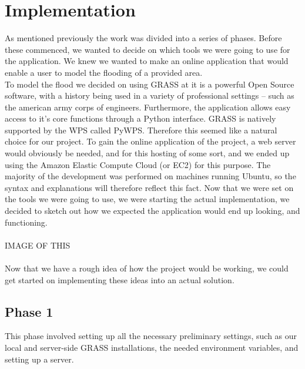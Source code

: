 
\chapter{Implementation} %

\label{ch:implementation} %


As mentioned previously the work was divided into a series of phases. Before these commenced, we wanted to decide on which tools we were going to use for the application. 
We knew we wanted to make an online application that would enable a user to model the flooding of a provided area.\\

To model the flood we decided on using GRASS at it is a powerful Open Source software, with a history being used in a variety of professional settings – such as the american army corps of engineers. Furthermore, the application allows easy access to it's core functions through a Python interface. 
GRASS is natively supported by the WPS called PyWPS. Therefore this seemed like a natural choice for our project. 
To gain the online application of the project, a web server would obviously be needed, and for this hosting of some sort, and we ended up using the Amazon Elastic Compute Cloud (or EC2) for this purpose.
The majority of the development was performed on machines running Ubuntu, so the syntax and explanations will therefore reflect this fact.
Now that we were set on the tools we were going to use, we were starting the actual implementation, we decided to sketch out how we expected the application would end up looking, and functioning.\\
\\

IMAGE OF THIS\\
\\

Now that we have a rough idea of how the project would be working, we could get started on implementing these ideas into an actual solution.

\section{Phase 1}
This phase involved setting up all the necessary preliminary settings, such as our local and server-side GRASS installations, the needed environment variables, and setting up a server. \\

